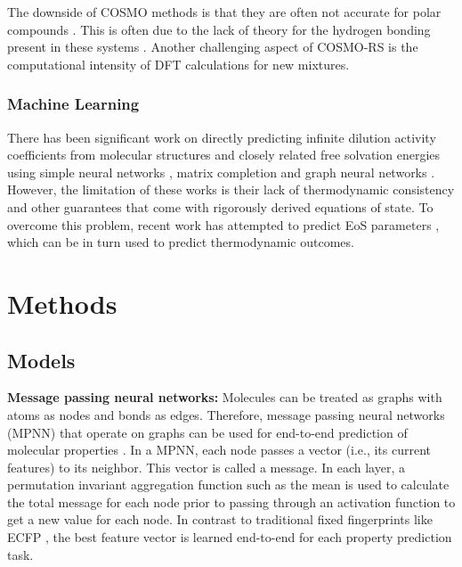 The downside of COSMO methods is that they are often not accurate for polar compounds \cite{Constantinescu2005, Kundu2011}. This is often due to the lack of theory for the hydrogen bonding present in these systems \cite{Kundu2011}. Another challenging aspect of COSMO-RS is the computational intensity of DFT calculations for new mixtures. 

\subsubsection{Machine Learning}

There has been significant work on directly predicting infinite dilution activity coefficients from molecular structures and closely related free solvation energies using simple neural networks \cite{Urata2002, RamirezBeltran2009, Nami2011, Behrooz2017}, matrix completion\cite{Jirasek2020} and  graph neural networks \cite{Vermeire2021, Felton2022, SanchezMedina2022, Qin2022, Rittig2022}. However, the limitation of these works is their lack of thermodynamic consistency and other guarantees that come with rigorously derived equations of state. To overcome this problem, recent work has attempted to predict EoS parameters \cite{Abbasi2020, Madani2021, Abdallahelhadj2022, Winter2022}, which can be in turn used to predict thermodynamic outcomes.
 
\section{Methods}
\subsection{Models}

\noindent
\textbf{Message passing neural networks:} Molecules can be treated as graphs with atoms as nodes and bonds as edges. Therefore, message passing neural networks (MPNN) that operate on graphs can be used for end-to-end prediction of molecular properties \cite{Gilmer2017}.  In a MPNN, each node passes a vector (i.e., its current features) to its neighbor. This  vector is called a message. In each layer, a permutation invariant aggregation function such as the mean is used to calculate the total message for each node prior to passing through an activation function to get a new value for each node.  In contrast to traditional fixed fingerprints like ECFP \cite{Rogers2010}, the best feature vector is learned end-to-end for each property prediction task.

